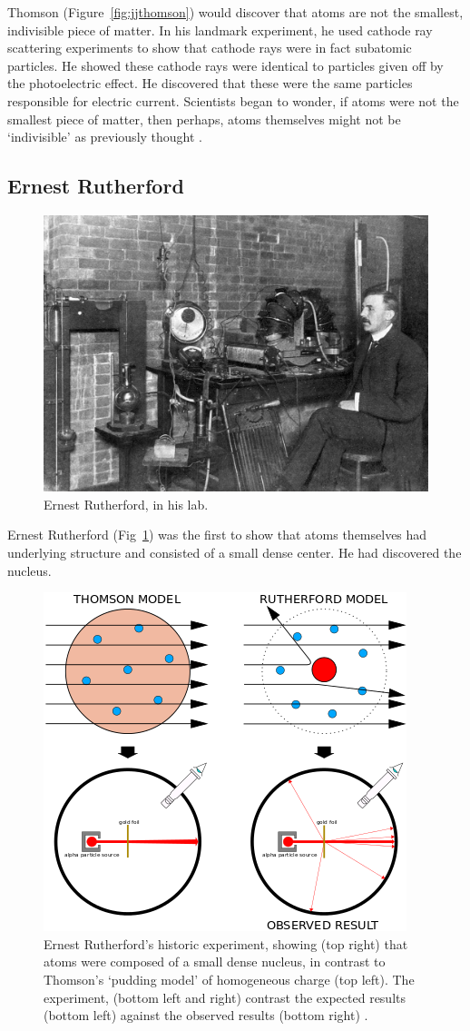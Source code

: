 Thomson (Figure~\ref{fig:jjthomson}) would discover that atoms are not the
smallest, indivisible piece of matter. In his landmark experiment, he used
cathode ray scattering experiments to show that cathode rays were in fact
subatomic particles. He showed these cathode rays were identical to particles
given off by the photoelectric effect. He discovered that these were the same
particles responsible for electric current.  Scientists began to wonder, if
atoms were not the smallest piece of matter, then perhaps, atoms themselves
might not be `indivisible' as previously thought \cite{nobelthomson2014}.

\subsection{Ernest Rutherford}

\begin{figure}[ht]
	\centering
	\includegraphics[width=0.6\linewidth]{./figures/ernestrutherford.jpg}
	\caption{Ernest Rutherford, in his lab.  \cite{Eve1939}}
	\label{fig:rutherford}
\end{figure}

Ernest Rutherford (Fig~\ref{fig:rutherford}) was the first to show that atoms
themselves had underlying structure and consisted of a small dense center.  He
had discovered the nucleus.

\begin{figure}[ht]
	\centering
	\includegraphics[width=0.6\linewidth]{./figures/geiger_marsden.png}
	\caption{
		Ernest Rutherford's historic experiment, showing (top right) that atoms were
		composed of a small dense nucleus, in contrast to Thomson's `pudding model'
		of homogeneous charge (top left). The experiment, (bottom left and right)
		contrast the expected results (bottom left) against the observed results
		(bottom right)  \cite{Kurzon2014}.
	}
	\label{fig:geigermarsden}
\end{figure}

